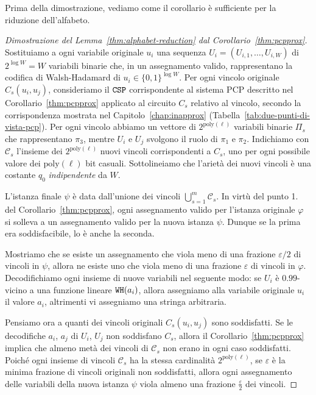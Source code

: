 Prima della dimostrazione, vediamo come il corollario è sufficiente per
la riduzione dell'alfabeto.

\begin{proof}[Dimostrazione del Lemma~\ref{thm:alphabet-reduction} dal
	Corollario~\ref{thm:pcpprox}]
	Sostituiamo a ogni variabile originale $u_i$ una sequenza
	$U_i = (U_{i,1}, \dots, U_{i, W})$ di $2^{\log W} = W$ variabili
	binarie che, in un assegnamento valido, rappresentano la codifica
	di Walsh-Hadamard di $u_i \in \{0, 1\}^{\log W}$.
	Per ogni vincolo originale $C_s(u_i, u_j)$, consideriamo il $\mathtt{CSP}$
	corrispondente al sistema PCP descritto nel Corollario~\ref{thm:pcpprox}
	applicato al circuito $C_s$ relativo al vincolo, secondo la corrispondenza
	mostrata nel Capitolo~\ref{chap:inapprox}
	(Tabella~\ref{tab:due-punti-di-vista-pcp}).
	Per ogni vincolo abbiamo un vettore di $2^{\mathrm{poly}(\ell)}$ variabili
	binarie $\Pi_s$ che rappresentano $\pi_3$, mentre $U_i$ e $U_j$ svolgono il
	ruolo di $\pi_1$ e $\pi_2$.
	Indichiamo con $\mathcal{C}_s$ l'insieme dei $2^{\mathrm{poly}(\ell)}$ nuovi
	vincoli corrispondenti a $C_s$, uno per ogni possibile valore dei
	$\mathrm{poly}(\ell)$ bit casuali.
	Sottolineiamo che l'arietà dei nuovi vincoli è una costante $q_0$
	\emph{indipendente} da $W$.

	L'istanza finale $\psi$ è data dall'unione dei vincoli
	$\bigcup_{s = 1}^{m} \mathcal{C}_s$.
	In virtù del punto 1. del Corollario~\ref{thm:pcpprox}, ogni assegnamento
	valido per l'istanza originale $\varphi$ si solleva a un assegnamento valido
	per la nuova istanza $\psi$. Dunque se la prima era soddisfacibile, lo è
	anche la seconda.

	Mostriamo che se esiste un assegnamento che viola meno di una frazione
	$\varepsilon/2$ di vincoli in $\psi$, allora ne esiste uno che viola
	meno di una frazione $\varepsilon$ di vincoli in $\varphi$.
	Decodifichiamo ogni insieme di nuove variabili nel seguente modo: se $U_i$
	è $0.99$-vicino a una funzione lineare $\mathtt{WH}(a_i)$, allora assegniamo alla
	variabile originale $u_i$ il valore $a_i$, altrimenti vi assegniamo una
	stringa arbitraria.

	Pensiamo ora a quanti dei vincoli originali $C_s (u_i, u_j)$ sono
	soddisfatti. Se le decodifiche $a_i$, $a_j$ di $U_i$, $U_j$ non soddisfano
	$C_s$, allora il Corollario~\ref{thm:pcpprox} implica che almeno metà dei
	vincoli di $\mathcal{C}_s$ non erano in ogni caso soddisfatti.
	Poiché ogni insieme di vincoli $\mathcal{C}_s$ ha la stessa cardinalità
	$2^{\mathrm{poly}(\ell)}$, se $\varepsilon$ è la minima frazione di vincoli
	originali non soddisfatti, allora ogni assegnamento delle variabili della
	nuova istanza $\psi$ viola almeno una frazione $\frac{\varepsilon}{2}$ dei
	vincoli.
\end{proof}

